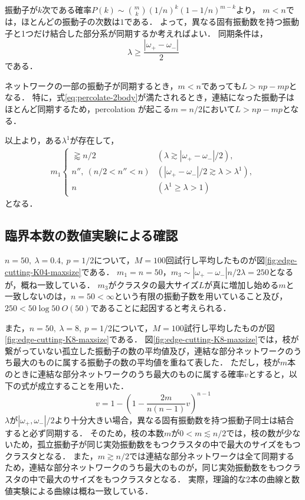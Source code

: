 \documentclass[../main]{subfiles}
\begin{document}
振動子が$k$次である確率$P(k)\sim\binom{m}{k}(1/n)^k(1-1/n)^{m-k}$より，
$m< n$では，ほとんどの振動子の次数は$1$である．
よって，異なる固有振動数を持つ振動子と1つだけ結合した部分系が同期するか考えればよい．
同期条件は，
\begin{equation}
    \label{eq:percolate-2body}
    \lambda\geq\frac{|\omega_+-\omega_-|}{2}
\end{equation}
である．

ネットワークの一部の振動子が同期するとき，$m<n$であっても$L>np-mp$となる．
特に，式\eqref{eq:percolate-2body}が満たされるとき，連結になった振動子はほとんど同期するため，percolation が起こる$m=n/2$において$L>np-mp$となる．

以上より，ある$\lambda^1$が存在して，
\begin{align}
    m_1
    \begin{cases}
        \gtrapprox n/2&(\lambda \gtrsim |\omega_+-\omega_-|/2),\\        
        n'',\ (n/2<n''<n)&(|\omega_+-\omega_-|/2\gtrsim \lambda>\lambda^1),\\        
        n&(\lambda^1 \geq \lambda>1)        
    \end{cases}
\end{align}
となる．
\subsection{臨界本数の数値実験による確認}
$n=50,\ \lambda=0.4,\ p=1/2$について，$M=100$回試行し平均したものが図\ref{fig:edge-cutting-K04-maxsize}である．
$m_1=n=50$，$m_3\sim |\omega_+-\omega_-|n/2\lambda=250$となるが，概ね一致している．
$m_3$がクラスタの最大サイズ$L$が真に増加し始める$m$と一致しないのは，$n=50<\infty$という有限の振動子数を用いていること及び，$250< 50\log 50\ O(50)$であることに起因すると考えられる．

また，$n=50,\ \lambda=8,\ p=1/2$について，$M=100$試行し平均したものが図\ref{fig:edge-cutting-K8-maxsize}である．
図\ref{fig:edge-cutting-K8-maxsize}では，枝が繋がっていない孤立した振動子の数の平均値及び，連結な部分ネットワークのうち最大のものに属する振動子の数の平均値を重ねて表した．
ただし，枝が$m$本のときに連結な部分ネットワークのうち最大のものに属する確率$v$とすると，以下の式が成立することを用いた．
\begin{equation}
    v=1-\left( 1-\frac{2m}{n(n-1)}v \right)^{n-1}
\end{equation}
$\lambda$が$|\omega_+,\omega_-|/2$より十分大きい場合，異なる固有振動数を持つ振動子同士は結合すると必ず同期する．
そのため，枝の本数$m$が$0<m\lesssim n/2$では，枝の数が少ないため，孤立振動子が同じ実効振動数をもつクラスタの中で最大のサイズをもつクラスタとなる．
また，$m\gtrsim n/2$では連結な部分ネットワークは全て同期するため，連結な部分ネットワークのうち最大のものが，同じ実効振動数をもつクラスタの中で最大のサイズをもつクラスタとなる．
実際，理論的な2本の曲線と数値実験による曲線は概ね一致している．
\end{document}
